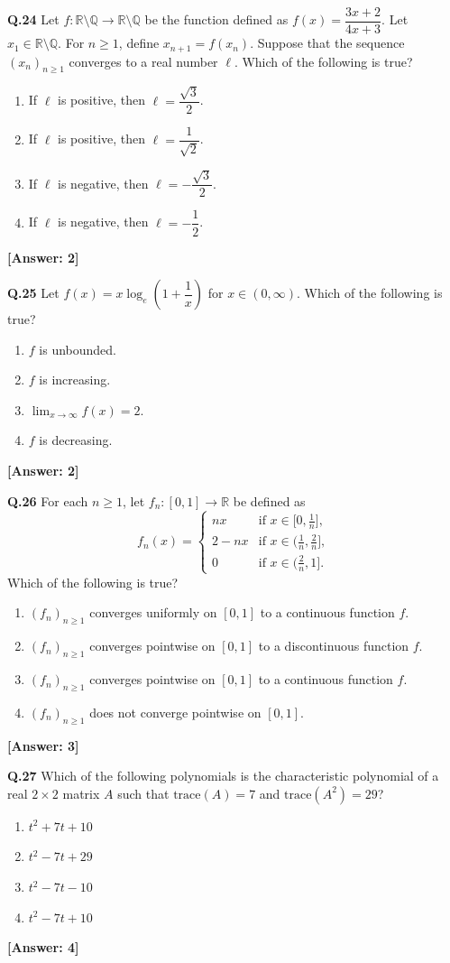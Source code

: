 \documentclass[12pt,a4paper]{article}
\newcommand{\ans}[1]{\quad\textcolor{anscolor}{\textbf{[Answer: #1]}}}
\begin{document}
\textbf{Q.24} Let $f:\mathbb{R}\setminus\mathbb{Q}\to\mathbb{R}\setminus\mathbb{Q}$ be the function defined as $f(x)=\dfrac{3x+2}{4x+3}$. Let $x_1\in\mathbb{R}\setminus\mathbb{Q}$. For $n\ge1$, define $x_{n+1}=f(x_n)$. Suppose that the sequence $(x_n)_{n\ge1}$ converges to a real number $\ell$. Which of the following is true?
\begin{enumerate}[label=\arabic*.]
\item If $\ell$ is positive, then $\ell=\dfrac{\sqrt{3}}{2}$.
\item If $\ell$ is positive, then $\ell=\dfrac{1}{\sqrt{2}}$.
\item If $\ell$ is negative, then $\ell=-\dfrac{\sqrt{3}}{2}$.
\item If $\ell$ is negative, then $\ell=-\dfrac{1}{2}$.
\end{enumerate}\ans{2}

\textbf{Q.25} Let $f(x)=x\log_e\!\left(1+\dfrac{1}{x}\right)$ for $x\in(0,\infty)$. Which of the following is true?
\begin{enumerate}[label=\arabic*.]
\item $f$ is unbounded. \item $f$ is increasing.
\item $\lim_{x\to\infty}f(x)=2$. \item $f$ is decreasing.
\end{enumerate}\ans{2}

\textbf{Q.26} For each $n\ge1$, let $f_n:[0,1]\to\mathbb{R}$ be defined as
\[f_n(x)=\begin{cases}nx&\text{if }x\in\bigl[0,\tfrac{1}{n}\bigr],\\2-nx&\text{if }x\in\bigl(\tfrac{1}{n},\tfrac{2}{n}\bigr],\\0&\text{if }x\in\bigl(\tfrac{2}{n},1\bigr].\end{cases}\]
Which of the following is true?
\begin{enumerate}[label=\arabic*.]
\item $(f_n)_{n\ge1}$ converges uniformly on $[0,1]$ to a continuous function $f$.
\item $(f_n)_{n\ge1}$ converges pointwise on $[0,1]$ to a discontinuous function $f$.
\item $(f_n)_{n\ge1}$ converges pointwise on $[0,1]$ to a continuous function $f$.
\item $(f_n)_{n\ge1}$ does not converge pointwise on $[0,1]$.
\end{enumerate}\ans{3}

\textbf{Q.27} Which of the following polynomials is the characteristic polynomial of a real $2\times2$ matrix $A$ such that $\text{trace}(A)=7$ and $\text{trace}(A^2)=29$?
\begin{enumerate}[label=\arabic*.]
\item $t^2+7t+10$ \item $t^2-7t+29$ \item $t^2-7t-10$ \item $t^2-7t+10$
\end{enumerate}\ans{4}
\end{document}
